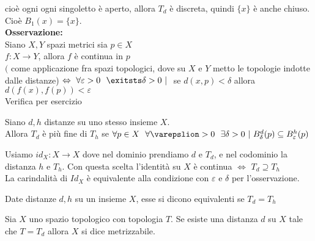 \documentclass{article}
\begin{document}
	cioè ogni ogni singoletto è aperto, allora  $T_d$ è discreta, quindi $\{x\}$ è anche chiuso. Cioè $B_1(x) = \{x\}$.\\
	 \textbf{Osservazione:}\\
	 Siano $X,Y$ spazi metrici sia $p\in X$\\
	  $f: X \rightarrow Y$, allora $f$ è continua in $p$\\
	   $($ come applicazione fra spazi topologici, dove su $X $ e $Y$ metto le topologie indotte dalle distanze) $ \Leftrightarrow \  \forall \varepsilon > 0 \ \ \exitsts \delta > 0 \ | \ $ se $d(x,p) < \delta$ allora  $d(f(x),f(p)) < \varepsilon$\\
	   Verifica per esercizio
	   \begin{coro}
	   	Siano $d, h$ distanze su uno stesso insieme $X.$\\
		Allora  $T_d$ è più fine di $T_h$ se $\forall p\in X \ \ \forall \varepslion > 0\ \ \exists \delta > 0 \ |  \ B_\delta^d(p)\subseteq B_\varepsilon ^h(p)$
	   \end{coro}
	   \begin{dimo}
	   	Usiamo $id_X: X \rightarrow X$ dove nel dominio prendiamo $d$ e $T_d$, e nel codominio la distanza $h$ e $T_h$. Con questa scelta l'identità su $X$ è continua $ \Leftrightarrow$ $T_d\supseteq T_h$\\
		La carindalità di  $Id_X$ è equivalente alla condizione con $\varepsilon$ e $\delta$ per l'osservazione.
	   \end{dimo}
	   \begin{defi}
	   	Date distanze $d,h$ su un insieme $X$, esse si dicono equivalenti se $T_d = T_h$
	   \end{defi}
	   \begin{defi}
	   	Sia $X$ uno spazio topologico con topologia $T$. Se esiste una distanza $d$ su $X$ tale che $T = T_d$ allora $X$ si dice metrizzabile.
	   \end{defi}
\end{document}
